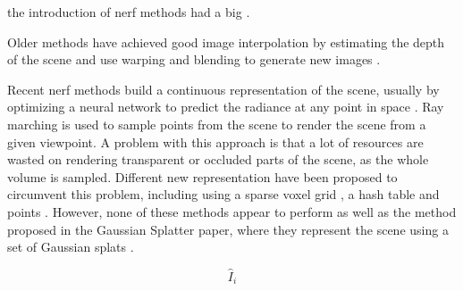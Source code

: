 the introduction of \gls{nerf} methods had a big  \cite{mildenhallNeRFRepresentingScenes2020a}.




Older methods have achieved good image interpolation by estimating the depth of the scene and use warping and blending to generate new images \cite{zitnickHighqualityVideoView2004}.

Recent \gls{nerf} methods build a continuous representation of the scene, usually by optimizing a neural network to predict the radiance at any point in space \cite{mildenhallNeRFRepresentingScenes2020a}.
Ray marching is used to sample points from the scene to render the scene from a given viewpoint.
A problem with this approach is that a lot of resources are wasted on rendering transparent or occluded parts of the scene, as the whole volume is sampled.
Different new representation have been proposed to circumvent this problem, including using a sparse voxel grid \cite{yuPlenoxelsRadianceFields2021a}, a hash table \cite{mullerInstantNeuralGraphics2022} and points \cite{xuPointNeRFPointbasedNeural2023}.
However, none of these methods appear to perform as well as the method proposed in the Gaussian Splatter paper, where they represent the scene using a set of Gaussian splats \cite{kerbl3DGaussianSplatting2023}.



\begin{equation}
    \hat{I}_i
\end{equation}
